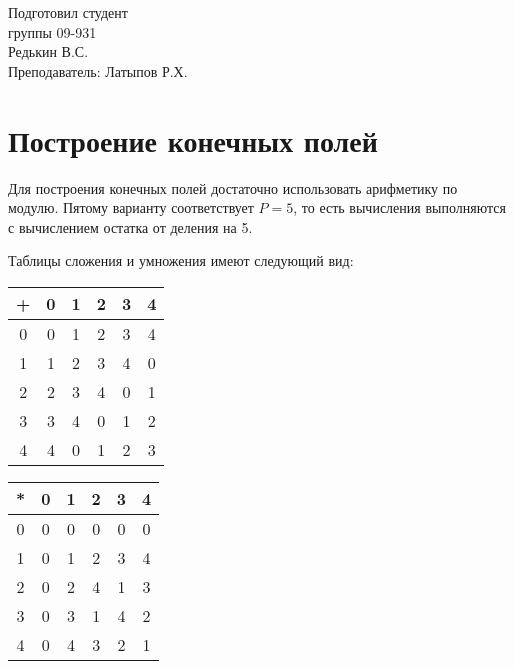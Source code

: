 \documentclass[a4paper,14pt]{extarticle}
\begin{document}
	\begin{titlepage}
		\noindent\par
		\noindent{}
	
	\vfill
	
	\hfill\begin{minipage}{0.40\textwidth}
		Подготовил студент\\
		группы 09-931\\
		Редькин В.С.\\
		Преподаватель: Латыпов Р.Х.
	\end{minipage}
		
	\end{titlepage}

	\setlength{\abovedisplayskip}{0pt}
	\setlength{\belowdisplayskip}{0pt}
	
	\section{Построение конечных полей}
	
	Для построения конечных полей достаточно использовать арифметику по модулю. Пятому варианту соответствует $P = 5$, то есть вычисления выполняются с вычислением остатка от деления на 5.
	
	Таблицы сложения и умножения имеют следующий вид:
	
	\begin{table}[!htb]
		\begin{minipage}{.5\linewidth}
			\centering
			\fontsize{20pt}{25pt}\selectfont
			\begin{tabular}{c | c c c c c }
				+ & 0 & 1 & 2 & 3 & 4 \\
				\hline
				0 & 0 & 1 & 2 & 3 & 4 \\
				1 & 1 & 2 & 3 & 4 & 0 \\
				2 & 2 & 3 & 4 & 0 & 1 \\
				3 & 3 & 4 & 0 & 1 & 2 \\
				4 & 4 & 0 & 1 & 2 & 3
			\end{tabular}
		\end{minipage}%
		\begin{minipage}{.5\linewidth}
			\centering
			\fontsize{20pt}{25pt}\selectfont
			\begin{tabular}{c | c c c c c }
				* & 0 & 1 & 2 & 3 & 4 \\
				\hline
				0 & 0 & 0 & 0 & 0 & 0 \\
				1 & 0 & 1 & 2 & 3 & 4 \\
				2 & 0 & 2 & 4 & 1 & 3 \\
				3 & 0 & 3 & 1 & 4 & 2 \\
				4 & 0 & 4 & 3 & 2 & 1
			\end{tabular}
		\end{minipage}
	\end{table}
\end{document}
